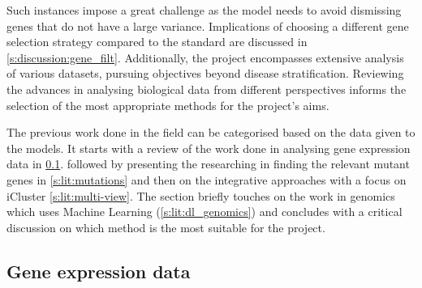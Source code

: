 Such instances impose a great challenge as the model needs to avoid dismissing genes that do not have a large variance. Implications of choosing a different gene selection strategy compared to the standard are discussed in \cref{s:discussion:gene_filt}. Additionally, the project encompasses extensive analysis of various datasets, pursuing objectives beyond disease stratification. Reviewing the advances in analysing biological data from different perspectives informs the selection of the most appropriate methods for the project's aims.


The previous work done in the field can be categorised based on the data given to the models. It starts with a review of the work done in analysing gene expression data in \ref{s:lit:rnaSeq}. followed by presenting the researching in finding the relevant mutant genes in \ref{s:lit:mutations} and then on the integrative approaches with a focus on iCluster \ref{s:lit:multi-view}. The section briefly touches on the work in genomics which uses Machine Learning (\ref{s:lit:dl_genomics}) and concludes with a critical discussion on which method is the most suitable for the project.

\subsection{Gene expression data} \label{s:lit:rnaSeq}

\vspace{3mm}
\vspace{3mm}

